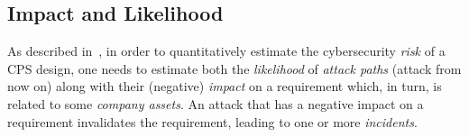 \subsection{Impact and Likelihood}\label{sec:impact}
As described in~\autocite{CORASMethod}, in order to quantitatively estimate the
cybersecurity \emph{risk} of a CPS design, one needs to estimate both the
\emph{likelihood} of \emph{attack paths} (attack from now on) along with their (negative) \emph{impact} on a requirement which, in
turn, is related to some \emph{company assets}. An attack that has a negative impact
on a requirement invalidates the requirement, leading to one or more \emph{incidents}.
